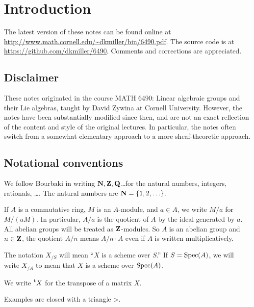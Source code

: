 
\section{Introduction}





The latest version of these notes can be found online at 
\url{http://www.math.cornell.edu/~dkmiller/bin/6490.pdf}. The source code 
is at \url{https://github.com/dkmiller/6490}. Comments and corrections are 
appreciated. 





\subsection{Disclaimer}

These notes originated in the course MATH 6490: Linear algebraic groups and 
their Lie algebras, taught by David Zywina at Cornell University. However, the 
notes have been substantially modified since then, and are not an exact 
reflection of the content and style of the original lectures. In particular, 
the notes often switch from a somewhat elementary approach to a more 
sheaf-theoretic approach. 





\subsection{Notational conventions}

We follow Bourbaki in writing $\mathbf{N},\mathbf{Z},\mathbf{Q}$\ldots for the natural numbers, 
integers, rationals, \ldots. The natural numbers are $\mathbf{N}=\{1,2,\ldots\}$. 

If $A$ is a commutative ring, $M$ is an $A$-module, and $a\in A$, 
we write $M/a$ for $M/(a M)$. In particular, $A/a$ is the quotient of $A$ by 
the ideal generated by $a$. All abelian groups will be treated as 
$\mathbf{Z}$-modules. So $A$ is an abelian group and $n\in \mathbf{Z}$, the quotient 
$A/n$ means $A/n\cdot A$ even if $A$ is written multiplicatively. 

The notation $X_{/S}$ will mean ``$X$ is a scheme over $S$.'' If 
$S=\operatorname{Spec}(A)$, we will write $X_{/A}$ to mean that $X$ is a scheme over 
$\operatorname{Spec}(A)$. 

We write $\prescript{\mathrm{t}}{}{X}$ for the transpose of a matrix $X$. 

Examples are closed with a triangle $\triangleright$. 

